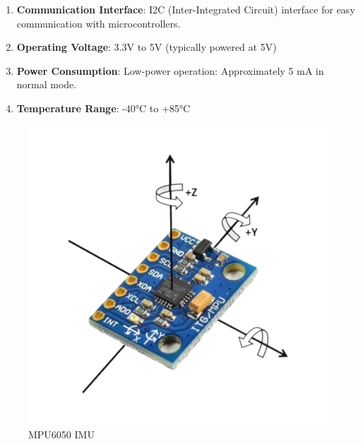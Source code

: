 {\begin{enumerate}
		\item \textbf{Communication Interface}: I2C (Inter-Integrated Circuit) interface for easy communication with microcontrollers.
		
		\item \textbf{Operating Voltage}: 3.3V to 5V (typically powered at 5V)
		
		\item \textbf{Power Consumption}: Low-power operation: Approximately 5 mA in normal mode.
		
		\item \textbf{Temperature Range}: -40°C to +85°C

	\end{enumerate}
	
	\begin{figure}[H]
		\centering
		\includegraphics[scale=0.38]{images/Content/mpu6050}
		\caption{MPU6050 IMU}
		\label{fig:mpu6050}
	\end{figure}
}


